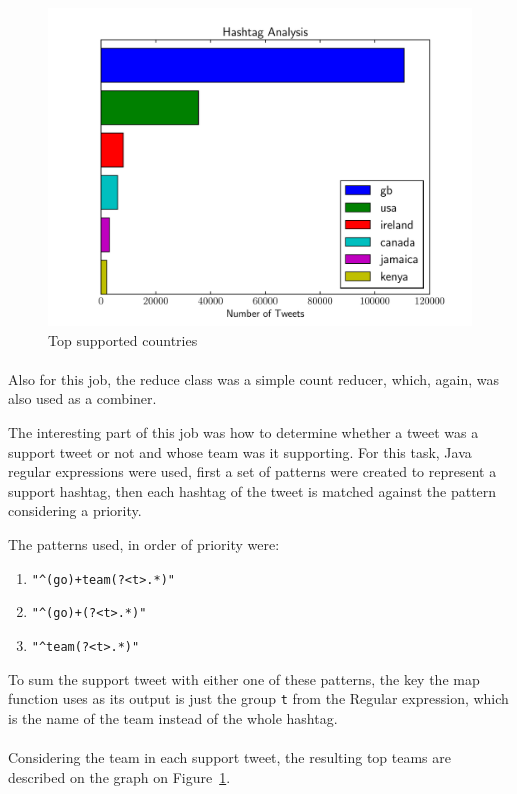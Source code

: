\documentclass[10pt,a4paper]{article}
\begin{document}
\begin{figure}[!b]
    \centering
    \includegraphics[width=.7\textwidth]{imgs/hashtag-analysis}
    \caption{Top supported countries}\label{fig::hashtag}
\end{figure}

\paragraph*{}
Also for this job, the reduce class was a simple count reducer, which, again,
was also used as a combiner.

The interesting part of this job was how to determine whether a tweet was a
support tweet or not and whose team was it supporting. For this task, Java
regular expressions were used, first a set of patterns were created to represent
a support hashtag, then each hashtag of the tweet is matched against the pattern
considering a priority.

The patterns used, in order of priority were:
\begin{enumerate}
    \item \verb|"^(go)+team(?<t>.*)"|
    \item \verb|"^(go)+(?<t>.*)"|
    \item \verb|"^team(?<t>.*)"|
\end{enumerate}

To sum the support tweet with either one of these patterns, the key the map
function uses as its output is just the group {\tt t} from the Regular
expression, which is the name of the team instead of the whole hashtag.


\paragraph*{}
Considering the team in each support tweet, the resulting top teams are
described on the graph on Figure~\ref{fig::hashtag}.
\end{document}
